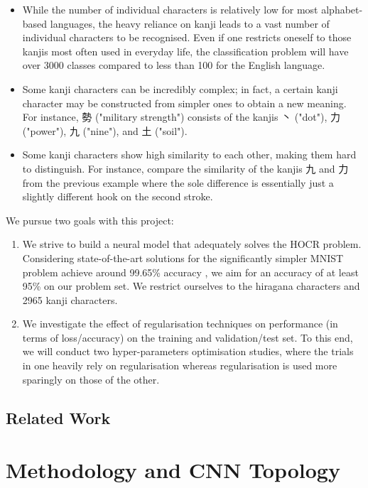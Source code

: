 \documentclass[british,12p]{article}
\begin{document}
    \begin{itemize}
    	\item While the number of individual characters is relatively low for most alphabet-based languages, the heavy reliance on kanji leads to a vast number of individual characters to be recognised. Even if one restricts oneself to those kanjis most often used in everyday life, the classification problem will have over 3000 classes compared to less than 100 for the English language.
    	\item Some kanji characters can be incredibly complex; in fact, a certain kanji character may be constructed from simpler ones to obtain a new meaning.  For instance, 勢 ("military strength") consists of the kanjis 丶 ("dot"), 力 ("power"), 九 ("nine"), and 土 ("soil").
       	\item Some kanji characters show high similarity to each other, making them hard to distinguish. For instance, compare the similarity of the kanjis 九 and 力 from the previous example where the sole difference is essentially just a slightly different hook on the second stroke.	
    \end{itemize}

	We pursue two goals with this project:
	\begin{enumerate}
		\item We strive to build a neural model that adequately solves the HOCR problem. Considering state-of-the-art solutions for the significantly simpler MNIST problem achieve around 99.65\% accuracy \cite{deepai:19}, we aim for an accuracy of at least 95\% on our problem set. We restrict ourselves to the hiragana characters and 2965 kanji characters. 
		\item We investigate the effect of regularisation techniques on performance (in terms of loss/accuracy) on the training and validation/test set. To this end, we will conduct two hyper-parameters optimisation studies, where the trials in one heavily rely on regularisation whereas regularisation is used more sparingly on those of the other.
	\end{enumerate}
	
	\subsection{Related Work}
	

    \section{Methodology and CNN Topology}
\end{document}
